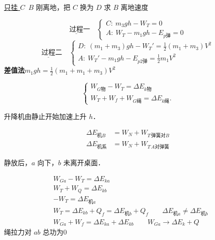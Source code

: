 \begin{problem}
\underline{只挂 $C$}\ $B$ 刚离地，把 $C$ 换为 $D$ 求 $B$ 离地速度
\begin{solution}
\[
\underline{\text{过程}}\text{一}\quad
\begin{cases}
C:\ m_3gh-W_T=0\\
A:\ W_T-m_1gh-E_{p\text{弹}}=0
\end{cases}
\]
\[
\underline{\text{过程}}\text{二}\quad
\begin{cases}
D:\ (m_1+m_3)gh-W_T'=\tfrac12(m_1+m_3)V^2\\
A:\ W_T'-m_1gh-E_{p2\text{弹}}=\tfrac12 m_1V^2
\end{cases}
\]
\textbf{差值法}\quad $m_1gh=\tfrac12(m_1+m_1+m_3)V^2$
\end{solution}
\end{problem}
\[
\begin{cases}
W_{G\text{物}}-W_T=\Delta E_{k\text{物}}\\
W_T+W_f+W_{G\text{绳}}=\Delta E_{k\text{绳}}.
\end{cases}
\]
\begin{problem}
升降机由静止开始加速上升 $h$．
\begin{solution}
\begin{align*}
\Delta E_{\text{机}B} &= W_N+W_{T\,\text{弹簧对}B}\\
\Delta E_{\text{机系}} &= W_N+W_{T\,A\text{对弹簧}}
\end{align*}
\end{solution}
\end{problem}
\begin{problem}
静放后，$a$ 向下，$b$ 未离开桌面．
\begin{solution}
\begin{align*}
&W_{Ga}-W_T=\Delta E_{ka}\\
&W_T+W_Q=\Delta E_{kb}\\
&-W_T=\Delta E_{\text{机}a}\\
&W_T=\Delta E_{kb}+Q_f=\Delta E_{\text{机}b}+Q_f\qquad \Delta E_{\text{机}a}\ne\Delta E_{\text{机}b}\\
&W_{Ga}+W_f=\Delta E_{ka}+\Delta E_{kb}\qquad W_{Ga}\to\Delta E_k+Q
\end{align*}
绳拉力对 $ab$ 总功为0
\end{solution}
\end{problem}
